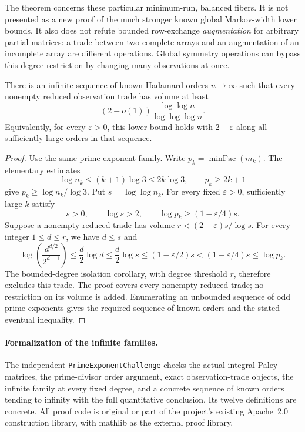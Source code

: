 The theorem concerns these particular minimum-run, balanced fibers. It
is not presented as a new proof of the much stronger known global
Markov-width lower bounds. It also does not refute bounded row-exchange
\emph{augmentation} for arbitrary partial matrices: a trade between two
complete arrays and an augmentation of an incomplete array are different
operations. Global symmetry operations can bypass this degree restriction
by changing many observations at once.

\begin{corollary}\label{s04:trd:linnik}
There is an infinite sequence of known Hadamard orders $n\to\infty$
such that every nonempty reduced observation trade has volume at least
\[
 (2-o(1))\frac{\log\log n}{\log\log\log n}.
\]
Equivalently, for every $\varepsilon>0$, this lower bound holds with
$2-\varepsilon$ along all sufficiently large orders in that sequence.
\end{corollary}
\begin{proof}
Use the same prime-exponent family. Write $p_k=\operatorname{minFac}(m_k)$.
The elementary estimates
\[
 \log n_k\le(k+1)\log3\le2k\log3,
 \qquad p_k\ge2k+1
\]
give $p_k\ge\log n_k/\log3$. Put $s=\log\log n_k$.
For every fixed $\varepsilon>0$, sufficiently large $k$ satisfy
\[
 s>0,\qquad \log s>2,\qquad
 \log p_k\ge(1-\varepsilon/4)s.
\]
Suppose a nonempty reduced trade has volume
$r<(2-\varepsilon)s/\log s$. For every integer $1\le d\le r$,
we have $d\le s$ and
\[
 \log\!\left(\frac{d^{d/2}}{2^{d-1}}\right)
 \le\frac d2\log d
 \le\frac d2\log s
 \le(1-\varepsilon/2)s
 <(1-\varepsilon/4)s
 \le\log p_k.
\]
The bounded-degree isolation corollary, with degree threshold $r$,
therefore excludes this trade. The proof covers every nonempty reduced
trade; no restriction on its volume is added. Enumerating an unbounded
sequence of odd prime exponents gives the required sequence of known
orders and the stated eventual inequality.
\end{proof}

\paragraph{Formalization of the infinite families.}
The independent \texttt{PrimeExponentChallenge} checks the actual integral
Paley matrices, the prime-divisor order argument, exact observation-trade
objects, the infinite family at every fixed degree, and a concrete sequence
of known orders tending to infinity with the full quantitative conclusion.
Its twelve definitions are concrete. All proof code is original or part
of the project's existing Apache~2.0 construction library, with mathlib
as the external proof library.

